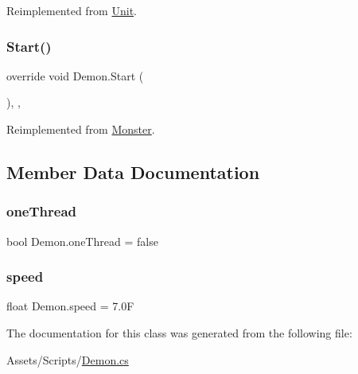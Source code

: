 Reimplemented from \mbox{\hyperlink{class_unit_a698a459fd5eeef7fc906f4657b723fa4}{Unit}}.

\mbox{\label{class_demon_ae40d3b2d791569cd6517117aa19335b3}} 
\subsubsection{\texorpdfstring{Start()}{Start()}}
{\footnotesize\ttfamily override void Demon.\+Start (\begin{DoxyParamCaption}{ }\end{DoxyParamCaption})\hspace{0.3cm}{\ttfamily [inline]}, {\ttfamily [protected]}, {\ttfamily [virtual]}}



Reimplemented from \mbox{\hyperlink{class_monster_a79f369a560bdcf5b3dfaf8c9382582d8}{Monster}}.



\subsection{Member Data Documentation}
\mbox{\label{class_demon_a89b29e16599d3d03485366ac8f29678d}} 
\subsubsection{\texorpdfstring{one\+Thread}{oneThread}}
{\footnotesize\ttfamily bool Demon.\+one\+Thread = false\hspace{0.3cm}{\ttfamily [static]}}

\mbox{\label{class_demon_aa70173ebd268fdf60a979f64d3c8a2aa}} 
\subsubsection{\texorpdfstring{speed}{speed}}
{\footnotesize\ttfamily float Demon.\+speed = 7.\+0F}



The documentation for this class was generated from the following file\+:\begin{DoxyCompactItemize}
\item 
Assets/\+Scripts/\mbox{\hyperlink{_demon_8cs}{Demon.\+cs}}\end{DoxyCompactItemize}
